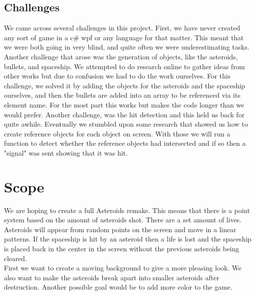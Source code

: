 \documentclass[10pt,conference,onecolumn,compsoc]{IEEEtran}
\begin{document}
\subsection{Challenges}
We came across several challenges in this project. First, we have never created any sort of game in a c\# wpf or any language for that matter. This meant that we were both going in very blind, and quite often we were underestimating tasks. Another challenge that arose was the generation of objects, like the asteroids, bullets, and spaceship. We attempted to do research online to gather ideas from other works but due to confusion we had to do the work ourselves. For this challenge, we solved it by adding the objects for the asteroids and the spaceship ourselves, and then the bullets are added into an array to be referenced via its element name. For the most part this works but makes the code longer than we would prefer. Another challenge, was the hit detection and this held us back for quite awhile. Eventually we stumbled upon some research that showed us how to create reference objects for each object on screen. With those we will run a function to detect whether the reference objects had intersected and if so then a "signal" was sent showing that it was hit. 



\section{Scope}
We are hoping to create a full Asteroids remake. This means that there is a point system based on the amount of asteroids shot. There are a set amount of lives. Asteroids will appear from random points on the screen and move in a linear patterns. If the spaceship is hit by an asteroid then a life is lost and the spaceship is placed back in the center in the screen without the previous asteroids being cleared.\\

First we want to create a moving background to give a more pleasing look. We also want to make the asteroids break apart into smaller asteroids after destruction. Another possible goal would be to add more color to the game. 
\end{document}
